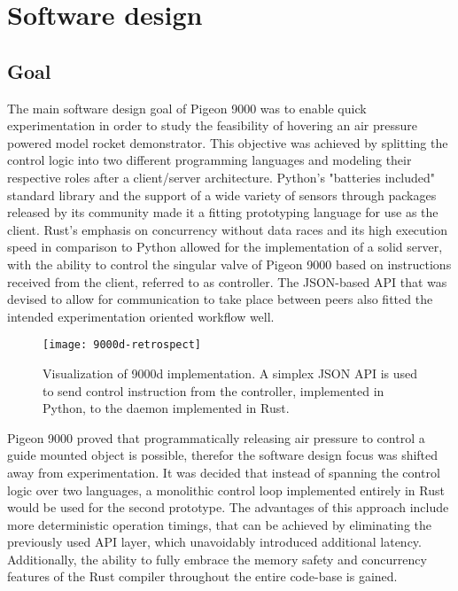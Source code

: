 \section{Software design}
\author{Philip Trauner}

\subsection{Goal}
The main software design goal of Pigeon 9000 was to enable quick experimentation in order to study the feasibility of hovering an air pressure powered model rocket demonstrator. This objective was achieved by splitting the control logic into two different programming languages and modeling their respective roles after a client/server architecture. 
Python's "batteries included" standard library and the support of a wide variety of sensors through packages released by its community made it a fitting prototyping language for use as the client. Rust's emphasis on concurrency without data races and its high execution speed in comparison to Python allowed for the implementation of a solid server, with the ability to control the singular valve of Pigeon 9000 based on instructions received from the client, referred to as controller. The JSON-based API that was devised to allow for communication to take place between peers also fitted the intended experimentation oriented workflow well.

\begin{figure}[H]
\centering

\texttt{[image: 9000d-retrospect]}
\caption{Visualization of 9000d implementation. A simplex JSON API is used to send control instruction from the controller, implemented in Python, to the daemon implemented in Rust.}
\end{figure}

Pigeon 9000 proved that programmatically releasing air pressure to control a guide mounted object is possible, therefor the software design focus was shifted away from experimentation. It was decided that instead of spanning the control logic over two languages, a monolithic control loop implemented entirely in Rust would be used for the second prototype. 
The advantages of this approach include more deterministic operation timings, that can be achieved by eliminating the previously used API layer, which unavoidably introduced additional latency. Additionally, the ability to fully embrace the memory safety and concurrency features of the Rust compiler throughout the entire code-base is gained.

